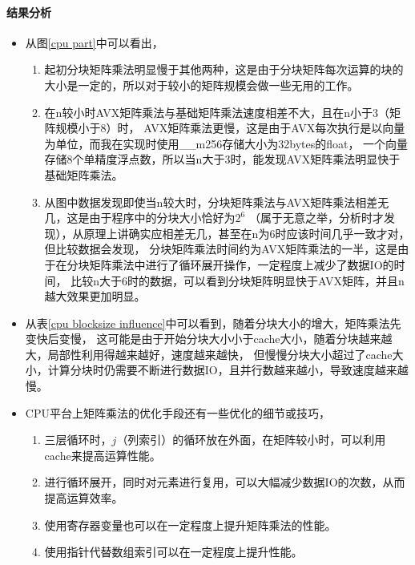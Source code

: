 \documentclass[UTF8]{article}
\begin{document}
    \paragraph{结果分析}
    \begin{itemize}
        \item 从图\ref{cpu part}中可以看出，
        \begin{enumerate}
            \item 起初分块矩阵乘法明显慢于其他两种，这是由于分块矩阵每次运算的块的大小是一定的，所以对于较小的矩阵规模会做一些无用的工作。
            \item 在n较小时AVX矩阵乘法与基础矩阵乘法速度相差不大，且在n小于3（矩阵规模小于8）时，
            AVX矩阵乘法更慢，这是由于AVX每次执行是以向量为单位，而我在实现时使用{\jetbrains \_\_m256}存储大小为32bytes的float，
            一个向量存储8个单精度浮点数，所以当n大于3时，能发现AVX矩阵乘法明显快于基础矩阵乘法。
            \item 从图中数据发现即使当n较大时，分块矩阵乘法与AVX矩阵乘法相差无几，这是由于程序中的分块大小恰好为$2^6$
            （属于无意之举，分析时才发现），从原理上讲确实应相差无几，甚至在n为6时应该时间几乎一致才对，但比较数据会发现，
            分块矩阵乘法时间约为AVX矩阵乘法的一半，这是由于在分块矩阵乘法中进行了循环展开操作，一定程度上减少了数据IO的时间，
            比较n大于6时的数据，可以看到分块矩阵明显快于AVX矩阵，并且n越大效果更加明显。
        \end{enumerate}
        \item 从表\ref{cpu blocksize influence}中可以看到，随着分块大小的增大，矩阵乘法先变快后变慢，
        这可能是由于开始分块大小小于cache大小，随着分块越来越大，局部性利用得越来越好，速度越来越快，
        但慢慢分块大小超过了cache大小，计算分块时仍需要不断进行数据IO，且并行数越来越小，导致速度越来越慢。
        \item CPU平台上矩阵乘法的优化手段还有一些优化的细节或技巧，
        \begin{enumerate}
            \item 三层循环时，$j$（列索引）的循环放在外面，在矩阵较小时，可以利用cache来提高运算性能。
            \item 进行循环展开，同时对元素进行复用，可以大幅减少数据IO的次数，从而提高运算效率。
            \item 使用寄存器变量也可以在一定程度上提升矩阵乘法的性能。
            \item 使用指针代替数组索引可以在一定程度上提升性能。
        \end{enumerate}
    \end{itemize}
\end{document}
